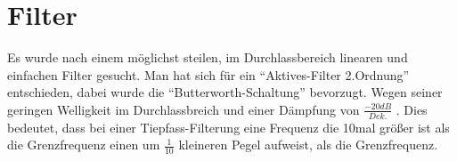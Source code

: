 \section{Filter}\label{sec:8.4}
Es wurde nach einem möglichst steilen, im Durchlassbereich linearen und einfachen Filter gesucht.
Man hat sich für ein \enquote{Aktives-Filter 2.Ordnung} entschieden, dabei wurde die \enquote{Butterworth-Schaltung} bevorzugt.
Wegen seiner geringen Welligkeit im Durchlassbreich und einer Dämpfung von $\frac{-20dB}{Dek.}$ .
Dies bedeutet, dass bei einer Tiepfass-Filterung eine Frequenz die 10mal größer ist als die Grenzfrequenz einen um $\frac{1}{10}$ kleineren Pegel aufweist, als die Grenzfrequenz.\\

